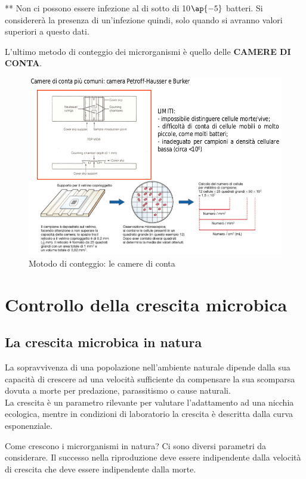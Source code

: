 \documentclass[11pt]{book}
\begin{document}
** Non ci possono essere infezione al di sotto di 10$\ap{-5}$ batteri. Si considererà la presenza di un'infezione quindi, solo quando si avranno valori superiori a questo dati.

\vspace{1em}
L'ultimo metodo di conteggio dei microrganismi è quello delle \textbf{CAMERE DI CONTA}.

\clearpage
\begin{figure}[htp]
\centering
\includegraphics[scale=0.5]{img/Camere di conta.png}
\caption{Motodo di conteggio: le camere di conta}
\label{}
\end{figure}

\chapter{Controllo della crescita microbica}
\section{La crescita microbica in natura}
La sopravvivenza di una popolazione nell’ambiente naturale dipende dalla sua capacità di crescere ad una velocità sufficiente da compensare la sua scomparsa dovuta a morte per predazione, parassitismo o cause naturali.\\
La crescita è un parametro rilevante per valutare l’adattamento ad una nicchia ecologica, mentre in condizioni di laboratorio la crescita è descritta dalla curva esponenziale.

Come crescono i microrganismi in natura? Ci sono diversi parametri da considerare. Il successo nella riproduzione deve essere indipendente dalla velocità di crescita che deve essere indipendente dalla morte.
\end{document}
